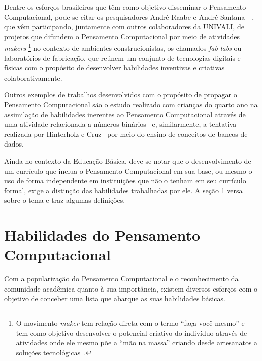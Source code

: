 Dentre os esforços brasileiros que têm como objetivo disseminar o Pensamento Computacional, pode-se citar os pesquisadores André Raabe e André Santana~\cite{santana_atividades_2016}~\cite{santana_lite_2016}, que vêm participando, juntamente com outros colaboradores da \acrshort{UNIVALI}, de projetos que difundem o Pensamento Computacional por meio de atividades \textit{makers} \footnote{O movimento \textit{maker} tem relação direta com o termo “faça você mesmo” e tem como objetivo desenvolver o potencial criativo do indivíduo através de atividades onde ele mesmo põe a “mão na massa” criando desde artesanatos a soluções tecnológicas~\cite{tanji_makers:_2017}.} no contexto de ambientes construcionistas, os chamados \textit{fab labs} ou laboratórios de fabricação, que reúnem um conjunto de tecnologias digitais e físicas com o propósito de desenvolver habilidades inventivas e criativas colaborativamente.

Outros exemplos de trabalhos desenvolvidos com o propósito de propagar o Pensamento Computacional são o estudo realizado com crianças do quarto ano na assimilação de habilidades inerentes ao Pensamento Computacional através de uma atividade relacionada a números binários~\cite{campos_organizacao_2014} e, similarmente, a tentativa realizada por Hinterholz e Cruz~\cite{hinterholz_desenvolvimento_2015} por meio do ensino de conceitos de bancos de dados. 

Ainda no contexto da Educação Básica, deve-se notar que o desenvolvimento de um currículo que inclua o Pensamento Computacional em sua base, ou mesmo o uso de forma independente em instituições que não o tenham em seu currículo formal, exige a distinção das habilidades trabalhadas por ele. A seção \ref{sec:habilidades} versa sobre o tema e traz algumas definições.

\section{Habilidades do Pensamento Computacional}\label{sec:habilidades}

Com a popularização do Pensamento Computacional e o reconhecimento da comunidade acadêmica quanto à sua importância, existem diversos esforços com o objetivo de conceber uma lista que abarque as suas habilidades básicas. 

